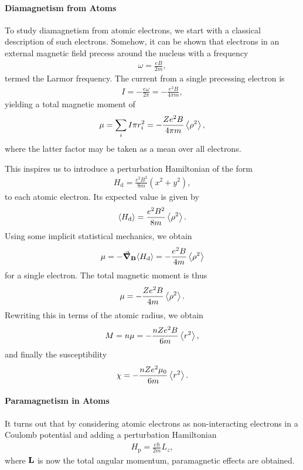 \paragraph{Diamagnetism from Atoms}
To study diamagnetism from atomic electrons, we start with a classical description of such electrons. Somehow, it can be shown that electrons in an external magnetic field precess around the nucleus with a frequency
\begin{align*}
	\omega = \frac{eB}{2m},
\end{align*}
termed the Larmor frequency. The current from a single precessing electron is
\begin{align*}
	I = -\frac{e\omega}{2\pi} =  -\frac{e^{2}B}{4\pi m},
\end{align*}
yielding a total magnetic moment of
\begin{align*}
	\mu = \sum\limits_{i}I\pi r_{i}^{2} = -\frac{Ze^{2}B}{4\pi m}\expval{\rho^{2}},
\end{align*}
where the latter factor may be taken as a mean over all electrons.

This inspires us to introduce a perturbation Hamiltonian of the form
\begin{align*}
	H_{\text{d}} = \frac{e^{2}B^{2}}{8m}(x^{2} + y^{2}),
\end{align*}
to each atomic electron. Its expected value is given by
\begin{align*}
	\expval{H_{\text{d}}} = \frac{e^{2}B^{2}}{8m}\expval{\rho^{2}}.
\end{align*}
Using some implicit statistical mechanics, we obtain
\begin{align*}
	\mu = -\grad_{\vb{B}}{\expval{H_{\text{d}}}} = -\frac{e^{2}B}{4m}\expval{\rho^{2}}
\end{align*}
for a single electron. The total magnetic moment is thus
\begin{align*}
	\mu = -\frac{Ze^{2}B}{4m}\expval{\rho^{2}}.
\end{align*}
Rewriting this in terms of the atomic radius, we obtain
\begin{align*}
	M = n\mu = -\frac{nZe^{2}B}{6m}\expval{r^{2}},
\end{align*}
and finally the susceptibility
\begin{align*}
	\chi = -\frac{nZe^{2}\mu_{0}}{6m}\expval{r^{2}}.
\end{align*}

\paragraph{Paramagnetism in Atoms}
It turns out that by considering atomic electrons as non-interacting electrons in a Coulomb potential and adding a perturbation Hamiltonian
\begin{align*}
	H_{\text{p}} = \frac{e\hbar}{2m}L_{z},
\end{align*}
where $\vb{L}$ is now the total angular momentum, paramagnetic effects are obtained.

